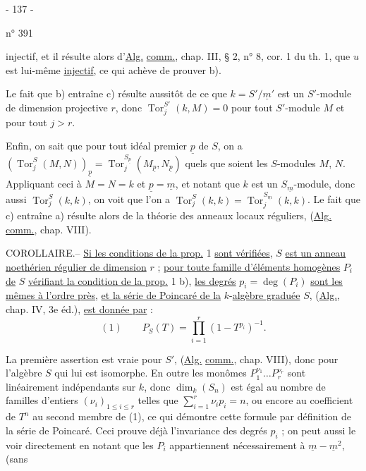 \begin{center}- 137 -\end{center}
\hfill n° 391

injectif, et il résulte alors d'\uline{Alg.} \uline{comm.}, chap. III, § 2, n° 8, cor. 1 du th. 1, que $u$ est lui-même \uline{injectif}, ce qui achève de prouver b).

Le fait que b) entraîne c) résulte aussitôt de ce que $k=S'/\underline m'$ est un $S'$-module de dimension projective $r$, donc $\operatorname{Tor}^{S'}_j(k,M)=0$ pour tout $S'$-module $M$ et pour tout $j>r$.

Enfin, on sait que pour tout idéal premier $\underline p$ de $S$, on a $(\operatorname{Tor}^S_j(M,N))_{\underline p}=\operatorname{Tor}^{S_{\underline p}}_j(M_{\underline p},N_{\underline p})$ quels que soient les $S$-modules $M$, $N$. Appliquant ceci à $M=N=k$ et $\underline p=\underline m$, et notant que $k$ est un $S_{\underline m}$-module, donc aussi $\operatorname{Tor}^S_j(k,k)$, on voit que l'on a $\operatorname{Tor}^S_j(k,k)=\operatorname{Tor}^{S_{\underline m}}_j(k,k)$. Le fait que c) entraîne a) résulte alors de la théorie des anneaux locaux réguliers, (\uline{Alg.} \uline{comm.}, chap. VIII).

COROLLAIRE.-- \uline{Si les conditions de la prop.} 1 \uline{sont vérifiées}, $S$ \uline{est un anneau noethérien régulier de dimension} $r$ ; \uline{pour toute famille d'éléments homogènes} $P_i$ \uline{de} $S$ \uline{vérifiant la condition de la prop.} 1 b), \uline{les degrés} $p_i=\deg(P_i)$ \uline{sont les mêmes à l'ordre près}, \uline{et la série de Poincaré de la} $k$-\uline{algèbre graduée} $S$, (\uline{Alg.}, chap. IV, 3e éd.), \uline{est donnée par} :
\[
(1)\qquad P_S(T)=\prod_{i=1}^r(1-T^{p_i})^{-1}.
\]

La première assertion est vraie pour $S'$, (\uline{Alg.} \uline{comm.}, chap. VIII), donc pour l'algèbre $S$ qui lui est isomorphe. En outre les monômes $P_1^{\nu_1}\ldots P_r^{\nu_r}$ sont linéairement indépendants sur $k$, donc $\dim_k(S_n)$ est égal au nombre de familles d'entiers $(\nu_i)_{1\leq i\leq r}$ telles que $\sum_{i=1}^r\nu_i p_i=n$, ou encore au coefficient de $T^n$ au second membre de (1), ce qui démontre cette formule par définition de la série de Poincaré. Ceci prouve déjà l'invariance des degrés $p_i$ ; on peut aussi le voir directement en notant que les $P_i$ appartiennent nécessairement à $\underline m-\underline m^2$, (sans
